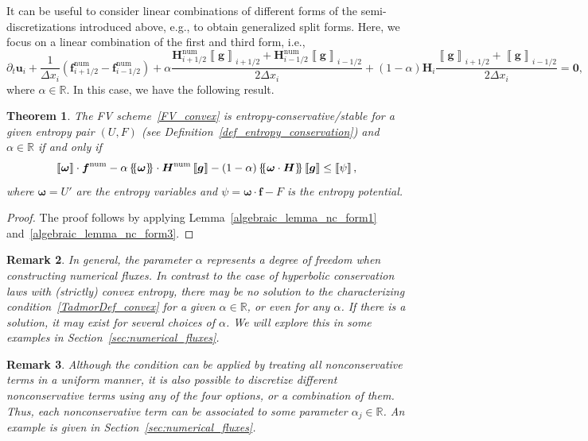 \documentclass[]{scrartcl}
\newcommand*{\ldblbrace}{\{\mskip-5mu \left \{}
\newcommand*{\rdblbrace}{ \}\mskip-5mu \right \}}
\newcommand{\mean}[1]{\left\ldblbrace #1 \right\rdblbrace}
\renewcommand{\vec}[1]{\boldsymbol{#1}}
\newcommand{\jump}[1]{\left\llbracket #1  \right\rrbracket}
\newtheorem{theorem}{Theorem}[section]
\newtheorem{remark}[theorem]{Remark}
\theoremstyle{definition}
\begin{document}
It can be useful to consider linear combinations of different forms of the semi-discretizations introduced above, e.g., to obtain generalized split forms.
Here, we focus on a linear combination of the first and third form, i.e.,
\begin{equation}
    \partial_t \vec{u}_i
    + \frac{1}{\Delta x_i} \left  ( \vec{f}^{\mathrm{num}}_{i+1/2} - \vec{f}^{\mathrm{num}}_{i-1/2}\right )
    + \alpha \frac{\vec{H}^{\mathrm{num}}_{i+1/2} \jump{\vec{g}}_{i+1/2} + \vec{H}^{\mathrm{num}}_{i-1/2}  \jump{\vec{g}}_{i-1/2}}{2 \Delta x_i}
    + (1 -\alpha) \vec{H}_i \frac{\jump{\vec{g}}_{i+1/2} + \jump{\vec{g}}_{i-1/2}}{ 2 \Delta x_i} = \vec{0},
\label{FV_convex}
\end{equation}
where $\alpha \in \mathbb{R}$.
In this case, we have the following result.
\begin{theorem}\label{th:EC_linear_combination}
The FV scheme~\eqref{FV_convex} is entropy-conservative/stable for a given entropy pair $(U, F)$ (see Definition~\ref{def_entropy_conservation}) and $\alpha \in \mathbb{R}$ if and only if
\begin{equation}
\label{TadmorDef_convex}
	\jump{\vec{\omega}} \cdot \vec{f}^\mathrm{num}
    - \alpha \mean{\vec{\omega}}\cdot\vec{H}^{\mathrm{num}}\jump{\vec{g}}
    - (1-\alpha) \mean{\vec{\omega} \cdot\vec{H}} \jump{\vec{g}}
    \leq \jump{\psi},
\end{equation}
where $\vec{\omega} = U'$ are the entropy variables and $\psi = \vec{\omega} \cdot \vec{f} - F$ is the entropy potential.
\end{theorem}
\begin{proof}
    The proof follows by applying Lemma~\ref{algebraic_lemma_nc_form1} and~\ref{algebraic_lemma_nc_form3}.
\end{proof}
\begin{remark}
    In general, the parameter $\alpha$ represents a degree of freedom when constructing numerical fluxes.
    In contrast to the case of hyperbolic conservation laws with (strictly) convex entropy, there may be no solution to the characterizing condition~\eqref{TadmorDef_convex} for a given $\alpha \in \mathbb{R}$, or even for any $\alpha$.
    If there is a solution, it may exist for several choices of $\alpha$.
    We will explore this in some examples in Section~\ref{sec:numerical_fluxes}.
\end{remark}

\begin{remark}
    Although the condition can be applied by treating all nonconservative terms in a uniform manner, it is also possible to discretize different nonconservative terms using any of the four options, or a combination of them.
    Thus, each nonconservative term can be associated to some parameter $\alpha_j \in \mathbb{R}$. An example is given in Section~\ref{sec:numerical_fluxes}.
\end{remark}
\end{document}
